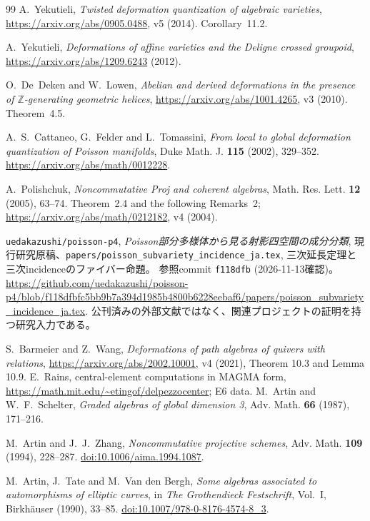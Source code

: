 \documentclass[11pt,a4paper]{ltjsarticle}
\numberwithin{equation}{section}
\begin{document}
\begin{thebibliography}{99}
A.~Yekutieli,
\emph{Twisted deformation quantization of algebraic varieties},
\url{https://arxiv.org/abs/0905.0488}, v5 (2014).
Corollary~11.2.

A.~Yekutieli,
\emph{Deformations of affine varieties and the Deligne crossed groupoid},
\url{https://arxiv.org/abs/1209.6243} (2012).

O.~De~Deken and W.~Lowen,
\emph{Abelian and derived deformations in the presence of
$\mathbb Z$-generating geometric helices},
\url{https://arxiv.org/abs/1001.4265}, v3 (2010).
Theorem~4.5.

A.~S.~Cattaneo, G.~Felder and L.~Tomassini,
\emph{From local to global deformation quantization of Poisson manifolds},
Duke Math. J. \textbf{115} (2002), 329--352.
\url{https://arxiv.org/abs/math/0012228}.

A.~Polishchuk,
\emph{Noncommutative Proj and coherent algebras},
Math. Res. Lett. \textbf{12} (2005), 63--74.
Theorem~2.4 and the following Remarks~2;
\url{https://arxiv.org/abs/math/0212182}, v4 (2004).

\texttt{uedakazushi/poisson-p4},
\emph{Poisson部分多様体から見る射影四空間の成分分類},
現行研究原稿、\nolinkurl{papers/poisson_subvariety_incidence_ja.tex},
三次延長定理と三次incidenceのファイバー命題。
参照commit \texttt{f118dfb} (2026-11-13確認)。
\url{https://github.com/uedakazushi/poisson-p4/blob/f118dfbfc5bb9b7a394d1985b4800b6228eebaf6/papers/poisson_subvariety_incidence_ja.tex}.
公刊済みの外部文献ではなく、関連プロジェクトの証明を持つ研究入力である。

 S.~Barmeier and Z.~Wang,
\emph{Deformations of path algebras of quivers with relations},
\url{https://arxiv.org/abs/2002.10001}, v4 (2021), Theorem 10.3 and Lemma 10.9.
 E.~Rains, central-element computations in MAGMA form,
\url{https://math.mit.edu/~etingof/delpezzocenter}; E6 data.
M.~Artin and W.~F.~Schelter,
\textit{Graded algebras of global dimension 3},
Adv. Math. \textbf{66} (1987), 171--216.

M.~Artin and J.~J.~Zhang,
\textit{Noncommutative projective schemes},
Adv. Math. \textbf{109} (1994), 228--287.
\href{https://doi.org/10.1006/aima.1994.1087}{doi:10.1006/aima.1994.1087}.

M.~Artin, J.~Tate and M.~Van den Bergh,
\textit{Some algebras associated to automorphisms of elliptic curves},
in \textit{The Grothendieck Festschrift}, Vol.~I,
Birkh\"auser (1990), 33--85.
\href{https://doi.org/10.1007/978-0-8176-4574-8_3}{doi:10.1007/978-0-8176-4574-8\_3}.


\end{thebibliography}
\end{document}
